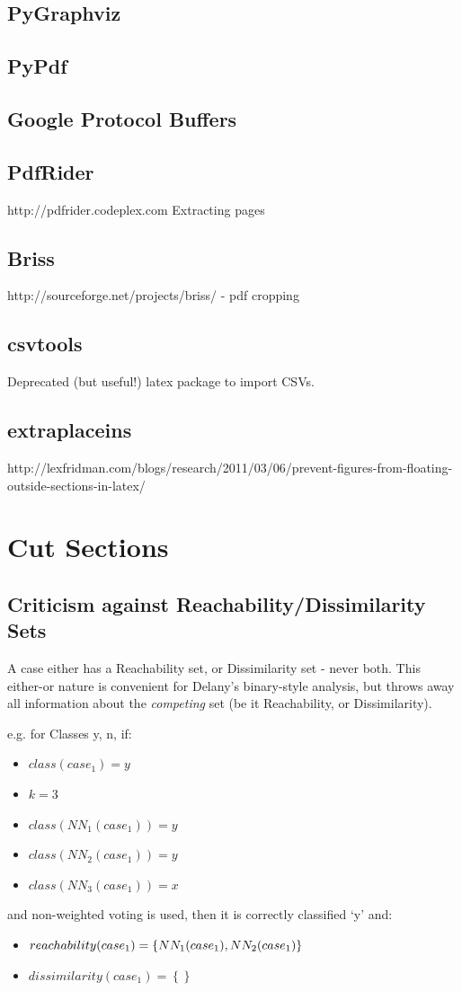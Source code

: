 \documentclass[a4paper,11pt]{report}
\begin{document}
\subsection*{PyGraphviz}
\subsection*{PyPdf}
\subsection*{Google Protocol Buffers}
\subsection*{PdfRider}
http://pdfrider.codeplex.com
Extracting pages
\subsection*{Briss}
http://sourceforge.net/projects/briss/ - pdf cropping
\subsection*{csvtools}
Deprecated (but useful!) latex package to import CSVs.

\subsection*{extraplaceins}
http://lexfridman.com/blogs/research/2011/03/06/prevent-figures-from-floating-outside-sections-in-latex/

\section{Cut Sections}
\subsection{Criticism against Reachability/Dissimilarity Sets}
A case either has a Reachability set, or Dissimilarity set - never both. This either-or nature is convenient for Delany's binary-style analysis, but throws away all information about the \emph{competing} set (be it Reachability, or Dissimilarity).

e.g. for Classes {y, n}, if:
\begin{itemize}
	\item $class(case_{1})=y$ 
	\item $k = 3$
	\item $class(NN_{1}(case_{1})) = y$ 
	\item $class(NN_{2}(case_{1})) = y$
	\item $class(NN_{3}(case_{1})) = x$  
\end{itemize}
and non-weighted voting is used, then it is correctly classified `y' and:
\begin{itemize}
	\item $reachability(case_{1})=\left\{ NN_{1}(case_{1}),\hphantom{}NN_{2}(case_{1})\right\} $
	\item $dissimilarity(case_{1})=\left\{ \right\} $
\end{itemize}
\end{document}
